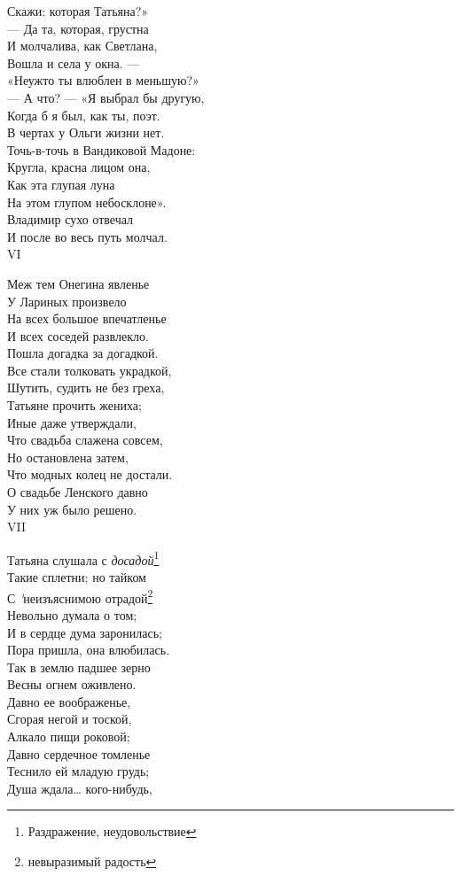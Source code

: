 Скажи: которая Татьяна?»\\
— Да та, которая, грустна\\
И молчалива, как Светлана,\\%
Вошла и села у окна. —\\
«Неужто ты влюблен в меньшую?»\\
— А что? — «Я выбрал бы другую,\\
Когда б я был, как ты, поэт.\\
В чертах у Ольги жизни нет.\\
Точь-в-точь в Вандиковой Мадоне:\\ %
Кругла, красна лицом она,\\
Как эта глупая луна\\
На этом глупом небосклоне».\\
Владимир сухо отвечал\\
И после во весь путь молчал.\\

VI

Меж тем Онегина явленье\\
У Лариных произвело\\
На всех большое впечатленье\\
И всех соседей развлекло.\\
Пошла догадка за догадкой.\\
Все стали толковать украдкой,\\
Шутить, судить не без греха,\\%
Татьяне прочить жениха;\\
Иные даже утверждали,\\
Что свадьба слажена совсем,\\
Но остановлена затем,\\
Что модных колец не достали.\\
О свадьбе Ленского давно\\
У них уж было решено.\\

VII%

Татьяна слушала с \emph{досадой}\footnote{Раздражение, неудовольствие}\\
Такие сплетни; но тайком\\
С \emph'{неизъяснимою отрадой}\footnote{невыразимый радость}\\ 
Невольно думала о том;\\
И в сердце дума заронилась;\\
Пора пришла, она влюбилась.\\
Так в землю падшее зерно\\
Весны огнем оживлено.\\
Давно ее воображенье,\\
Сгорая негой и тоской,\\
Алкало пищи роковой;\\
Давно сердечное томленье\\
Теснило ей младую грудь;\\
Душа ждала… кого-нибудь,\\

